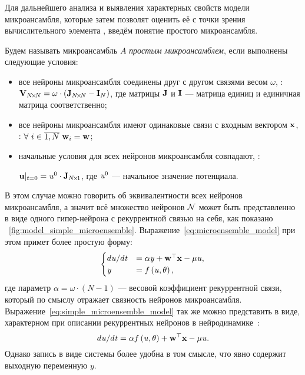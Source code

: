 Для дальнейшего анализа и выявления характерных свойств модели микроансамбля, которые затем позволят оценить её с точки зрения вычислительного элемента , введём понятие простого микроансамбля.
\begin{Definition*}
    Будем называть микроансамбль $A$ \textit{простым микроансамблем}, если выполнены следующие условия:
    \begin{itemize}
        \item все нейроны микроансамбля соединены друг с другом связями весом $\omega$, \ie: $\mathrm{\mathbf{V}}_{N\!\times\!N} = \omega \cdot \left( \mathrm{\mathbf{J}}_{N\!\times\!N} - \mathrm{\mathbf{I}}_{N} \right)$, где матрицы $\mathrm{\mathbf{J}}$ и $\mathrm{\mathbf{I}}$  --- матрица единиц и единичная матрица соответственно;
        \item все нейроны микроансамбля имеют одинаковые связи с входным вектором $\mathrm{\mathbf{x}}$, \ie: $\forall\ i \in \overline{1,N}\ \mathrm{\mathbf{w}}_{i} = \mathrm{\mathbf{w}}$;
        \item начальные условия для всех нейронов микроансамбля совпадают, \ie: \par $\mathrm{\mathbf{u}}|_{t=0} = \mathit{u}^{0} \cdot \mathrm{\mathbf{J}}_{N\!\times\!1}$, где $\mathit{u}^{0}$ --- начальное значение потенциала.
    \end{itemize}
\end{Definition*}

В этом случае можно говорить об эквивалентности всех нейронов микроансамбля, а значит всё множество нейронов $\mathcal{N}$ может быть представленно в виде одного гипер-нейрона с рекуррентной связью на себя, как показано \onfigure~\ref{fig:model_simple_microensemble}. Выражение~\eqref{eq:microensemble_model} при этом примет более простую форму:
\begin{equation}
    \label{eq:simple_microensemble_model}
    \begin{cases}
    d\mathit{u}/d\mathit{t} &= \alpha \mathit{y} + \mathrm{\mathbf{w}}^{\top} \mathrm{\mathbf{x}} - \mu \mathit{u}, \\
    \mathit{y}              &= f\left( \mathit{u}, \theta \right), \\
    \end{cases}
\end{equation}
где параметр $\alpha = \omega \cdot \left( N - 1 \right)$ --- весовой коэффициент рекуррентной связи, который по смыслу отражает связность нейронов микроансамбля. Выражение~\eqref{eq:simple_microensemble_model} так же можно представить в виде, характерном при описании рекуррентных нейронов в нейродинамике~\cite{Haykin2008}:
\begin{equation}
    \nonumber
    d\mathit{u}/d\mathit{t} = \alpha f\left( \mathit{u}, \theta \right) + \mathrm{\mathbf{w}}^{\top} \mathrm{\mathbf{x}} - \mu \mathit{u}.
\end{equation}
Однако запись в виде системы более удобна в том смысле, что явно содержит выходную переменную $y$.

